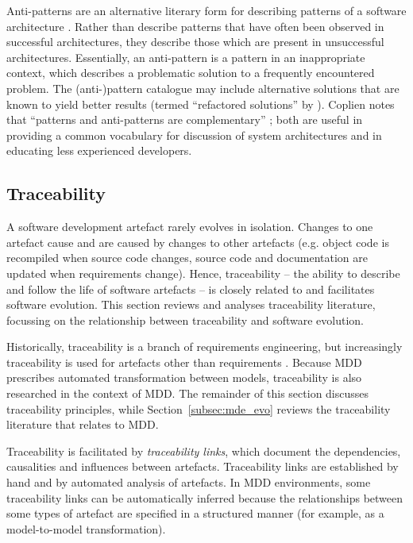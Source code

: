 Anti-patterns are an alternative literary form for describing patterns of a software architecture \cite{brown98antipatterns}. Rather than describe patterns that have often been observed in successful architectures, they describe those which are present in unsuccessful architectures. Essentially, an anti-pattern is a pattern in an inappropriate context, which describes a problematic solution to a frequently encountered problem. The (anti-)pattern catalogue may include alternative solutions that are known to yield better results (termed ``refactored solutions'' by \cite{brown98antipatterns}). Coplien notes that ``patterns and anti-patterns are complementary'' \cite[pg13]{brown98antipatterns}; both are useful in providing a common vocabulary for discussion of system architectures and in educating less experienced developers.


\subsection{Traceability}
\label{subsec:traceability}
A software development artefact rarely evolves in isolation. Changes to one artefact cause and are caused by changes to other artefacts (e.g. object code is recompiled when source code changes, source code and documentation are updated when requirements change). Hence, traceability -- the ability to describe and follow the life of software artefacts \cite{winkler09survey,lago09scoped} -- is closely related to and facilitates software evolution. This section reviews and analyses traceability literature, focussing on the relationship between traceability and software evolution.

Historically, traceability is a branch of requirements engineering, but increasingly traceability is used for artefacts other than requirements \cite{winkler09survey}. Because MDD prescribes automated transformation between models, traceability is also researched in the context of MDD. The remainder of this section discusses traceability principles, while Section~\ref{subsec:mde_evo} reviews the traceability literature that relates to MDD.

Traceability is facilitated by \emph{traceability links}, which document the dependencies, causalities and influences between artefacts. Traceability links are established by hand and by automated analysis of artefacts. In MDD environments, some traceability links can be automatically inferred because the relationships between some types of artefact are specified in a structured manner (for example, as a model-to-model transformation).


